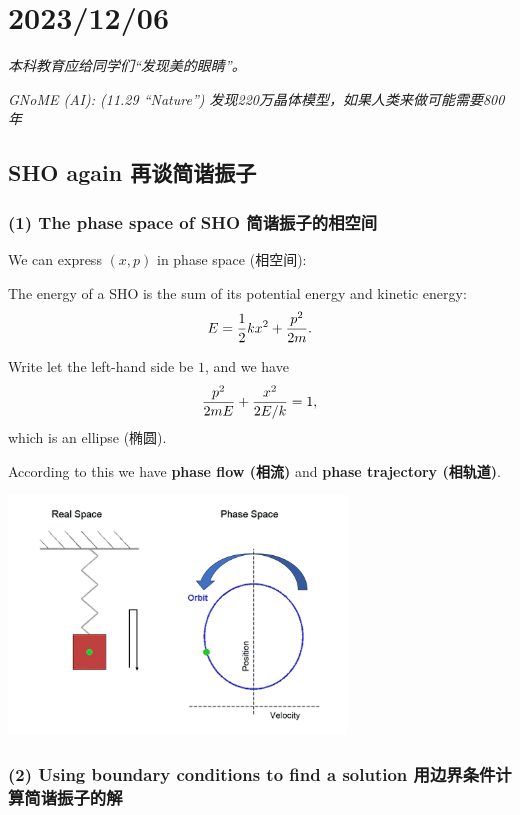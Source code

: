 \chapter{2023/12/06}\label{20231206}

\emph{本科教育应给同学们``发现美的眼睛''。}

\emph{GNoME (AI): (11.29 ``Nature'')
发现220万晶体模型，如果人类来做可能需要800年}

\section{SHO again
再谈简谐振子}\label{sho-again-ux518dux8c08ux7b80ux8c10ux632fux5b50}

\subsection*{(1) The phase space of SHO
简谐振子的相空间}\label{the-phase-space-of-sho-ux7b80ux8c10ux632fux5b50ux7684ux76f8ux7a7aux95f4}

We can express \((x, p)\) in phase space (相空间):

The energy of a SHO is the sum of its potential energy and kinetic
energy: \[E = {1 \over 2} kx^2 + {p^2 \over 2m}.\]

Write let the left-hand side be \(1\), and we have
\[{p^2 \over 2mE} + {x^2 \over 2E / k} = 1,\] which is an ellipse
(椭圆).

According to this we have \textbf{phase flow (相流)} and \textbf{phase trajectory (相轨道)}.

\begin{center}
    \includegraphics[height=180pt]{assets/Simple_Harmonic_Motion_Orbit.png}
\end{center}

\subsection*{(2) Using boundary conditions to find a solution
用边界条件计算简谐振子的解}\label{using-boundary-conditions-to-find-a-solution-ux7528ux8fb9ux754cux6761ux4ef6ux8ba1ux7b97ux7b80ux8c10ux632fux5b50ux7684ux89e3}

